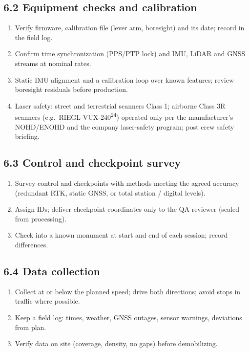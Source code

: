 \subsection*{6.2 Equipment checks and calibration}
\begin{enumerate}[label=\alph*.]
\item Verify firmware, calibration file (lever arm, boresight) and its date; record in the field log.
\item Confirm time synchronization (PPS/PTP lock) and IMU, LiDAR and GNSS streams at nominal rates.
\item Static IMU alignment and a calibration loop over known features; review boresight residuals before production.
\item Laser safety: street and terrestrial scanners Class 1; airborne Class 3R scanners (e.g.\ RIEGL VUX-240\textsuperscript{24}) operated only per the manufacturer's NOHD/ENOHD and the company laser-safety program; post crew safety briefing.
\end{enumerate}

\subsection*{6.3 Control and checkpoint survey}
\begin{enumerate}[label=\alph*.]
\item Survey control and checkpoints with methods meeting the agreed accuracy (redundant RTK, static GNSS, or total station / digital levels).
\item Assign IDs; deliver checkpoint coordinates only to the QA reviewer (sealed from processing).
\item Check into a known monument at start and end of each session; record differences.
\end{enumerate}

\subsection*{6.4 Data collection}
\begin{enumerate}[label=\alph*.]
\item Collect at or below the planned speed; drive both directions; avoid stops in traffic where possible.
\item Keep a field log: times, weather, GNSS outages, sensor warnings, deviations from plan.
\item Verify data on site (coverage, density, no gaps) before demobilizing.
\end{enumerate}

